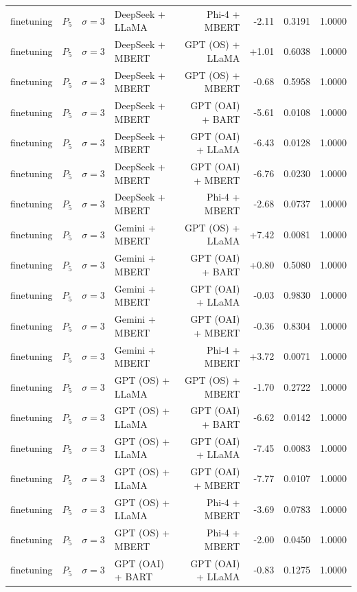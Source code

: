\begin{table}[htbp]
\begin{tabular*}{\textwidth}{@{\extracolsep{\fill}}llllrrrl}
finetuning & $P_5$ & $\sigma{=}3$ & DeepSeek + LLaMA & Phi-4 + MBERT & -2.11 & 0.3191 & 1.0000 \\
finetuning & $P_5$ & $\sigma{=}3$ & DeepSeek + MBERT & GPT (OS) + LLaMA & +1.01 & 0.6038 & 1.0000 \\
finetuning & $P_5$ & $\sigma{=}3$ & DeepSeek + MBERT & GPT (OS) + MBERT & -0.68 & 0.5958 & 1.0000 \\
finetuning & $P_5$ & $\sigma{=}3$ & DeepSeek + MBERT & GPT (OAI) + BART & -5.61 & 0.0108 & 1.0000 \\
finetuning & $P_5$ & $\sigma{=}3$ & DeepSeek + MBERT & GPT (OAI) + LLaMA & -6.43 & 0.0128 & 1.0000 \\
finetuning & $P_5$ & $\sigma{=}3$ & DeepSeek + MBERT & GPT (OAI) + MBERT & -6.76 & 0.0230 & 1.0000 \\
finetuning & $P_5$ & $\sigma{=}3$ & DeepSeek + MBERT & Phi-4 + MBERT & -2.68 & 0.0737 & 1.0000 \\
finetuning & $P_5$ & $\sigma{=}3$ & Gemini + MBERT & GPT (OS) + LLaMA & +7.42 & 0.0081 & 1.0000 \\
finetuning & $P_5$ & $\sigma{=}3$ & Gemini + MBERT & GPT (OAI) + BART & +0.80 & 0.5080 & 1.0000 \\
finetuning & $P_5$ & $\sigma{=}3$ & Gemini + MBERT & GPT (OAI) + LLaMA & -0.03 & 0.9830 & 1.0000 \\
finetuning & $P_5$ & $\sigma{=}3$ & Gemini + MBERT & GPT (OAI) + MBERT & -0.36 & 0.8304 & 1.0000 \\
finetuning & $P_5$ & $\sigma{=}3$ & Gemini + MBERT & Phi-4 + MBERT & +3.72 & 0.0071 & 1.0000 \\
finetuning & $P_5$ & $\sigma{=}3$ & GPT (OS) + LLaMA & GPT (OS) + MBERT & -1.70 & 0.2722 & 1.0000 \\
finetuning & $P_5$ & $\sigma{=}3$ & GPT (OS) + LLaMA & GPT (OAI) + BART & -6.62 & 0.0142 & 1.0000 \\
finetuning & $P_5$ & $\sigma{=}3$ & GPT (OS) + LLaMA & GPT (OAI) + LLaMA & -7.45 & 0.0083 & 1.0000 \\
finetuning & $P_5$ & $\sigma{=}3$ & GPT (OS) + LLaMA & GPT (OAI) + MBERT & -7.77 & 0.0107 & 1.0000 \\
finetuning & $P_5$ & $\sigma{=}3$ & GPT (OS) + LLaMA & Phi-4 + MBERT & -3.69 & 0.0783 & 1.0000 \\
finetuning & $P_5$ & $\sigma{=}3$ & GPT (OS) + MBERT & Phi-4 + MBERT & -2.00 & 0.0450 & 1.0000 \\
finetuning & $P_5$ & $\sigma{=}3$ & GPT (OAI) + BART & GPT (OAI) + LLaMA & -0.83 & 0.1275 & 1.0000 \\

\end{tabular*}
\end{table}
